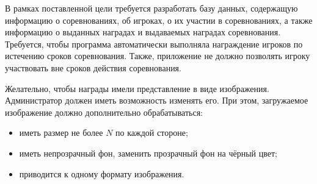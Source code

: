 



В рамках поставленной цели требуется разработать базу данных, содержащую информацию о соревнованиях, об игроках, о их участии в соревнованиях, а также информацию о выданных наградах и выдаваемых наградах соревнования. Требуется, чтобы программа автоматически выполняла награждение игроков по истечению сроков соревнования. Также, приложение не должно позволять игроку участвовать вне сроков действия соревнования. 

Желательно, чтобы награды имели представление в виде изображения. Администратор должен иметь возможность изменять его. При этом, загружаемое изображение должно дополнительно обрабатываться:
\begin{itemize}
	\item иметь размер не более $N$ по каждой стороне;
	\item иметь непрозрачный фон, заменить прозрачный фон на чёрный цвет;
	\item приводится к одному формату изображения.
\end{itemize}

